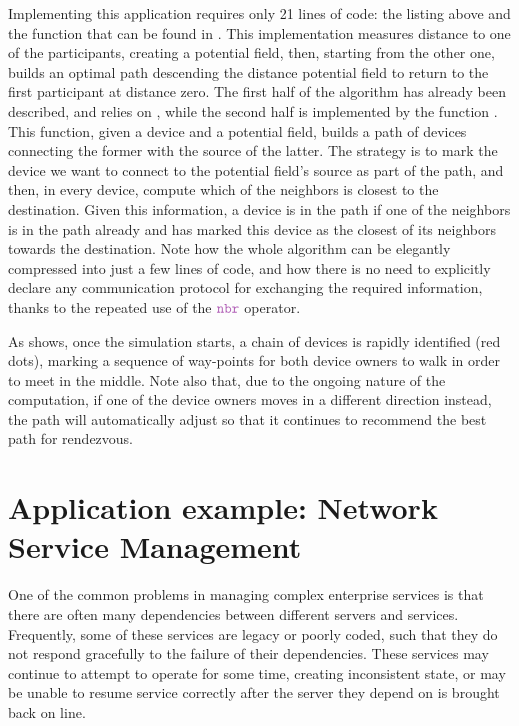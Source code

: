 \documentclass[12pt,a4paper,twoside,openright]{book}
\begin{document}
Implementing this application requires only 21 lines of code: the listing above and the function \texttt{} that can be found in .
%
This implementation measures distance to one of the participants, creating a potential field, then, starting from the other one, builds an optimal path descending the distance potential field to return to the first participant at distance zero.
%
The first half of the algorithm has already been described, and relies on \texttt{}, while the second half is implemented by the function \texttt{}.
%
This function, given a device and a potential field, builds a path of devices connecting the former with the source of the latter.
%
The strategy is to mark the device we want to connect to the potential field's source as part of the path, and then, in every device, compute which of the neighbors is closest to the destination.
%
Given this information, a device is in the path if one of the neighbors is in the path already and has marked this device as the closest of its neighbors towards the destination.
%
Note how the whole algorithm can be elegantly compressed into just a few lines of code, and how there is no need to explicitly declare any communication protocol for exchanging the required information, thanks to the repeated use of the $\nbrK$ operator.

As  shows, once the simulation starts, a chain of devices is rapidly identified (red dots), marking a sequence of way-points for both device owners to walk in order to meet in the middle.
%
Note also that, due to the ongoing nature of the computation, if one of the device owners moves in a different direction instead, the path will automatically adjust so that it continues to recommend the best path for rendezvous.

\section{Application example: Network Service Management}
\label{protelis-network-service}

One of the common problems in managing complex enterprise services is that there are often many dependencies between different servers and services.
%
Frequently, some of these services are legacy or poorly coded, such that they do not respond gracefully to the failure of their dependencies.  These services may continue to attempt to operate for some time, creating inconsistent state, or may be unable to resume service correctly after the server they depend on is brought back on line.
\end{document}

